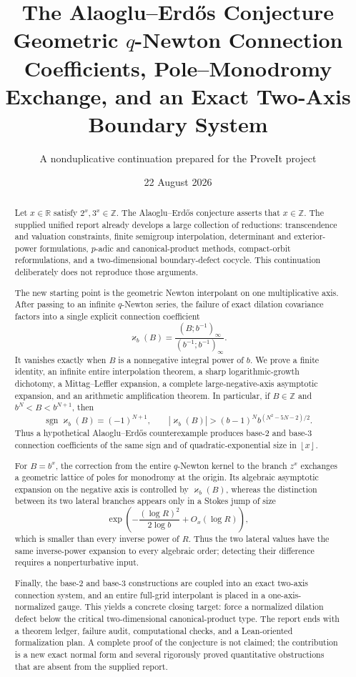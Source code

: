 \documentclass[11pt]{article}
\title{\textbf{The Alaoglu--Erd\H{o}s Conjecture}\\[0.35em]
\Large Geometric $q$-Newton Connection Coefficients, Pole--Monodromy Exchange, and an Exact Two-Axis Boundary System}
\author{A nonduplicative continuation prepared for the ProveIt project}
\date{22 August 2026}
\theoremstyle{definition}
\newcommand{\kk}{\varkappa}
\newcommand{\Z}{\mathbb{Z}}
\newcommand{\R}{\mathbb{R}}
\newcommand{\qpi}[2]{\left(#1;#2\right)_{\!\infty}}
\newcommand{\sgn}{\operatorname{sgn}}
\newcommand{\floor}[1]{\left\lfloor #1\right\rfloor}
\begin{document}
\maketitle

\begin{abstract}
Let $x\in\R$ satisfy $2^x,3^x\in\Z$.  The Alaoglu--Erd\H{o}s conjecture asserts that $x\in\Z$.  The supplied unified report already develops a large collection of reductions: transcendence and valuation constraints, finite semigroup interpolation, determinant and exterior-power formulations, $p$-adic and canonical-product methods, compact-orbit reformulations, and a two-dimensional boundary-defect cocycle.  This continuation deliberately does not reproduce those arguments.

The new starting point is the geometric Newton interpolant on one multiplicative axis.  After passing to an infinite $q$-Newton series, the failure of exact dilation covariance factors into a single explicit connection coefficient
\[
 \kk_b(B)=\frac{\qpi{B}{b^{-1}}}{\qpi{b^{-1}}{b^{-1}}}.
\]
It vanishes exactly when $B$ is a nonnegative integral power of $b$.  We prove a finite identity, an infinite entire interpolation theorem, a sharp logarithmic-growth dichotomy, a Mittag--Leffler expansion, a complete large-negative-axis asymptotic expansion, and an arithmetic amplification theorem.  In particular, if $B\in\Z$ and $b^N<B<b^{N+1}$, then
\[
 \sgn \kk_b(B)=(-1)^{N+1},\qquad
 |\kk_b(B)|>(b-1)^N b^{(N^2-5N-2)/2}.
\]
Thus a hypothetical Alaoglu--Erd\H{o}s counterexample produces base-$2$ and base-$3$ connection coefficients of the same sign and of quadratic-exponential size in $\floor{x}$.

For $B=b^x$, the correction from the entire $q$-Newton kernel to the branch $z^x$ exchanges a geometric lattice of poles for monodromy at the origin.  Its algebraic asymptotic expansion on the negative axis is controlled by $\kk_b(B)$, whereas the distinction between its two lateral branches appears only in a Stokes jump of size
\[
 \exp\!\left(-\frac{(\log R)^2}{2\log b}+O_x(\log R)\right),
\]
which is smaller than every inverse power of $R$.  Thus the two lateral values have the same
inverse-power expansion to every algebraic order; detecting their difference requires a
nonperturbative input.

Finally, the base-$2$ and base-$3$ constructions are coupled into an exact two-axis connection system, and an entire full-grid interpolant is placed in a one-axis-normalized gauge.  This yields a concrete closing target: force a normalized dilation defect below the critical two-dimensional canonical-product type.  The report ends with a theorem ledger, failure audit, computational checks, and a Lean-oriented formalization plan.  A complete proof of the conjecture is not claimed; the contribution is a new exact normal form and several rigorously proved quantitative obstructions that are absent from the supplied report.
\end{abstract}
\end{document}
